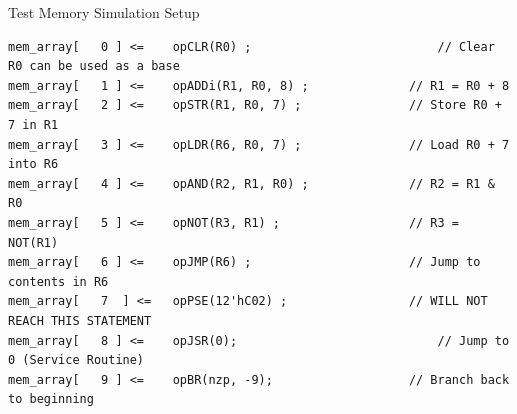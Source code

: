 \documentclass[journal, twocolumn, final,11pt,letterpaper]{IEEEtran}
\begin{document}
Test Memory Simulation Setup
\begin{lstlisting}
mem_array[   0 ] <=    opCLR(R0) ;							// Clear R0 can be used as a base
mem_array[   1 ] <=    opADDi(R1, R0, 8) ;				// R1 = R0 + 8
mem_array[   2 ] <=    opSTR(R1, R0, 7) ;				// Store R0 + 7 in R1
mem_array[   3 ] <=    opLDR(R6, R0, 7) ;				// Load R0 + 7 into R6
mem_array[   4 ] <=    opAND(R2, R1, R0) ;				// R2 = R1 & R0
mem_array[   5 ] <=    opNOT(R3, R1) ; 					// R3 = NOT(R1)
mem_array[	 6 ] <=	   opJMP(R6) ; 						// Jump to contents in R6
mem_array[	 7	] <=   opPSE(12'hC02) ;					// WILL NOT REACH THIS STATEMENT
mem_array[   8 ] <=    opJSR(0);							// Jump to 0 (Service Routine)
mem_array[	 9 ] <=    opBR(nzp, -9);					// Branch back to beginning

\end{lstlisting}


\end{document}
